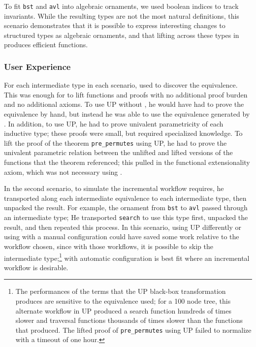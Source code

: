 To fit \lstinline{bst} and \lstinline{avl} into algebraic ornaments,
we used boolean indices to track invariants.
While the resulting types are not the most natural definitions,
this scenario demonstrates that it is possible to express interesting changes to structured types as algebraic ornaments,
and that lifting across these types in \toolnamec produces efficient functions.

\subsubsection{User Experience}
\label{sec:caseuser}

For each intermediate type in each scenario,  used \toolnamec to discover the equivalence.
This was enough for \toolnamec to lift functions and proofs 
with no additional proof burden and no additional axioms.
To use UP without \toolnamec, he would have had to prove the equivalence by hand,
but instead he was able to use the equivalence generated by \toolnamec.
In addition, to use UP, he had to prove univalent parametricity of each inductive type;
these proofs were small, but required specialized knowledge.
To lift the proof of the theorem \lstinline{pre_permutes} using UP, 
he had to prove the univalent parametric relation between the unlifted and lifted versions of the
functions that the theorem referenced; this pulled in the functional extensionality axiom, which was not necessary 
using \toolnamec.

In the second scenario, to simulate the incremental workflow \toolnamec requires, he transported along each intermediate equivalence to each intermediate type,
then unpacked the result.
For example, the ornament from \lstinline{bst} to \lstinline{avl} passed through an intermediate type;
He transported \lstinline{search} to use this type first, unpacked the result, and then repeated this process.
In this scenario, using UP differently or using \toolnamec with a manual configuration could have saved some work relative to the workflow chosen,
since with those workflows, it is possible to skip 
the intermediate type;\footnote{The performances of the terms that the UP black-box transformation produces are sensitive to the equivalence used;
for a 100 node tree, this alternate workflow in UP produced a search function
hundreds of times slower and traversal functions thousands of times slower
than the functions that \toolnamec produced. The lifted proof of \lstinline{pre_permutes} using UP failed to normalize
with a timeout of one hour.}
\toolnamec with automatic configuration is best fit where an incremental workflow is desirable.

